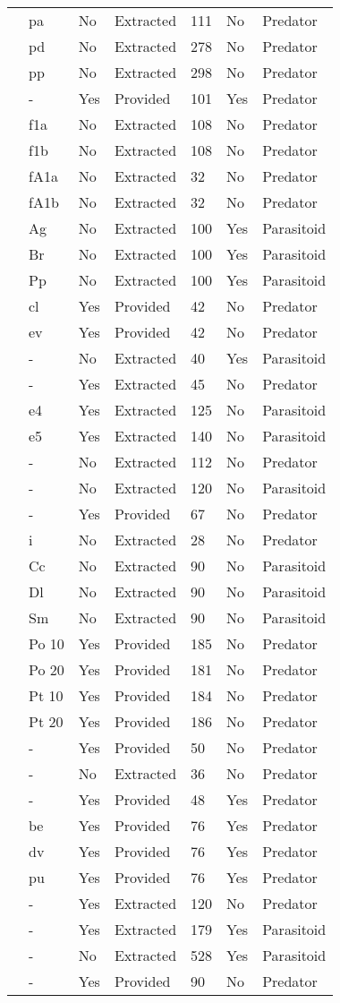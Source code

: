 \begin{longtable}{lllllll}
\citet{Eveleigh:1982aa}&pa&No&Extracted&111&No&Predator\tabularnewline
\citet{Eveleigh:1982aa}&pd&No&Extracted&278&No&Predator\tabularnewline
\citet{Eveleigh:1982aa}&pp&No&Extracted&298&No&Predator\tabularnewline
\citet{Fussmann:2005aa}&-&Yes&Provided&101&Yes&Predator\tabularnewline
\citet{Griffen:2007aa}&f1a&No&Extracted&108&No&Predator\tabularnewline
\citet{Griffen:2007aa}&f1b&No&Extracted&108&No&Predator\tabularnewline
\citet{Griffen:2007aa}&fA1a&No&Extracted&32&No&Predator\tabularnewline
\citet{Griffen:2007aa}&fA1b&No&Extracted&32&No&Predator\tabularnewline
\citet{Hassan:1976aa}&Ag&No&Extracted&100&Yes&Parasitoid\tabularnewline
\citet{Hassan:1976aa}&Br&No&Extracted&100&Yes&Parasitoid\tabularnewline
\citet{Hassan:1976aa}&Pp&No&Extracted&100&Yes&Parasitoid\tabularnewline
\citet{Hossie:2016aa}&cl&Yes&Provided&42&No&Predator\tabularnewline
\citet{Hossie:2016aa}&ev&Yes&Provided&42&No&Predator\tabularnewline
\citet{Huffaker:1982aa}&-&No&Extracted&40&Yes&Parasitoid\tabularnewline
\citet{Johnson:2006aa}&-&Yes&Extracted&45&No&Predator\tabularnewline
\citet{Jones:1988aa}&e4&Yes&Extracted&125&No&Parasitoid\tabularnewline
\citet{Jones:1988aa}&e5&Yes&Extracted&140&No&Parasitoid\tabularnewline
\citet{Katz:1985ai}&-&No&Extracted&112&No&Predator\tabularnewline
\citet{Kfir:1983aa}&-&No&Extracted&120&No&Parasitoid\tabularnewline
\citet{Kratina:2009aa}&-&Yes&Provided&67&No&Predator\tabularnewline
\citet{Krylov:1992aa}&i&No&Extracted&28&No&Predator\tabularnewline
\citet{Kumar:1985aa}&Cc&No&Extracted&90&No&Parasitoid\tabularnewline
\citet{Kumar:1985aa}&Dl&No&Extracted&90&No&Parasitoid\tabularnewline
\citet{Kumar:1985aa}&Sm&No&Extracted&90&No&Parasitoid\tabularnewline
\citet{Lang:2012aa}&Po 10&Yes&Provided&185&No&Predator\tabularnewline
\citet{Lang:2012aa}&Po 20&Yes&Provided&181&No&Predator\tabularnewline
\citet{Lang:2012aa}&Pt 10&Yes&Provided&184&No&Predator\tabularnewline
\citet{Lang:2012aa}&Pt 20&Yes&Provided&186&No&Predator\tabularnewline
\citet{Long:2012aa}&-&Yes&Provided&50&No&Predator\tabularnewline
\citet{Mansour:1991aa}&-&No&Extracted&36&No&Predator\tabularnewline
\citet{Medoc:2013aa}&-&Yes&Provided&48&Yes&Predator\tabularnewline
\citet{Medoc:2015aa}&be&Yes&Provided&76&Yes&Predator\tabularnewline
\citet{Medoc:2015aa}&dv&Yes&Provided&76&Yes&Predator\tabularnewline
\citet{Medoc:2015aa}&pu&Yes&Provided&76&Yes&Predator\tabularnewline
\citet{Mertz:1968aa}&-&Yes&Extracted&120&No&Predator\tabularnewline
\citet{Mills:2004aa}&-&Yes&Extracted&179&Yes&Parasitoid\tabularnewline
\citet{Montoya:2000aa}&-&No&Extracted&528&Yes&Parasitoid\tabularnewline
\citet{Omkar:2004aa}&-&Yes&Provided&90&No&Predator\tabularnewline

\end{longtable}
